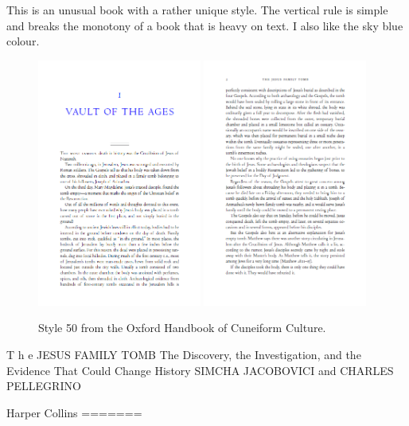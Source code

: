 This is an unusual book with a rather unique style. The vertical rule is simple and breaks the monotony of a book that is heavy on text. I also like the sky blue colour.
\begin{figure}[ht]
\includegraphics[width=0.48\textwidth]{./chapters/chapter53}\hfill
\includegraphics[width=0.48\textwidth]{./chapters/chapter53a}
\caption{Style 50 from the Oxford Handbook of Cuneiform Culture.}
\end{figure}

T h e
JESUS
FAMILY
TOMB
The Discovery, the Investigation,
and the Evidence
That Could Change History
SIMCHA JACOBOVICI and CHARLES PELLEGRINO

Harper Collins
\lipsum
=======


